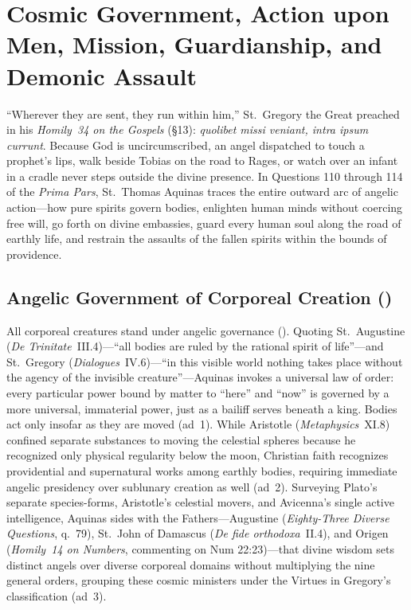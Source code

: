\section{Cosmic Government, Action upon Men, Mission, Guardianship, and Demonic Assault}

``Wherever they are sent, they run within him,'' St.~Gregory the Great preached in his \emph{Homily~34 on the Gospels} (\S13): \emph{quolibet missi veniant, intra ipsum currunt}. Because God is uncircumscribed, an angel dispatched to touch a prophet's lips, walk beside Tobias on the road to Rages, or watch over an infant in a cradle never steps outside the divine presence. In Questions 110 through 114 of the \emph{Prima Pars}, St.~Thomas Aquinas traces the entire outward arc of angelic action---how pure spirits govern bodies, enlighten human minds without coercing free will, go forth on divine embassies, guard every human soul along the road of earthly life, and restrain the assaults of the fallen spirits within the bounds of providence.

\subsection{Angelic Government of Corporeal Creation ()}

All corporeal creatures stand under angelic governance (). Quoting St.~Augustine (\emph{De Trinitate}~III.4)---``all bodies are ruled by the rational spirit of life''---and St.~Gregory (\emph{Dialogues}~IV.6)---``in this visible world nothing takes place without the agency of the invisible creature''---Aquinas invokes a universal law of order: every particular power bound by matter to ``here'' and ``now'' is governed by a more universal, immaterial power, just as a bailiff serves beneath a king. Bodies act only insofar as they are moved (ad~1). While Aristotle (\emph{Metaphysics}~XI.8) confined separate substances to moving the celestial spheres because he recognized only physical regularity below the moon, Christian faith recognizes providential and supernatural works among earthly bodies, requiring immediate angelic presidency over sublunary creation as well (ad~2). Surveying Plato's separate species-forms, Aristotle's celestial movers, and Avicenna's single active intelligence, Aquinas sides with the Fathers---Augustine (\emph{Eighty-Three Diverse Questions}, q.~79), St.~John of Damascus (\emph{De fide orthodoxa}~II.4), and Origen (\emph{Homily~14 on Numbers}, commenting on Num 22:23)---that divine wisdom sets distinct angels over diverse corporeal domains without multiplying the nine general orders, grouping these cosmic ministers under the Virtues in Gregory's classification (ad~3).

